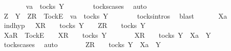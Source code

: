 \begin{isabellebody}
\ \ \ \ \isamarkupfalse%
\ \isamarkupfalse%
\ {\isachardoublequoteopen}va\ {\isasymin}\ tocks\ Y{\isachardoublequoteclose}\isanewline
\ \ \ \ \ \ \isamarkupfalse%
\ tocks{\isachardot}cases\ \isamarkupfalse%
\ auto\isanewline
\ \ \ \ \isamarkupfalse%
\ \isamarkupfalse%
\ {\isachardoublequoteopen}Z\ {\isasymsubseteq}\ Y\ {\isasymLongrightarrow}\ {\isacharbrackleft}Z{\isacharbrackright}\isactrlsub R\ {\isacharhash}\ {\isacharbrackleft}Tock{\isacharbrackright}\isactrlsub E\ {\isacharhash}\ va\ {\isasymin}\ tocks\ Y{\isachardoublequoteclose}\isanewline
\ \ \ \ \ \ \isamarkupfalse%
\ tocks{\isachardot}intros\ \isamarkupfalse%
\ blast\isanewline
\ \ \isamarkupfalse%
\isanewline
{}\isamarkupfalse%
\isanewline
\ \ \isamarkupfalse%
\ Xa\ {\isasymsigma}{\isacharprime}\isanewline
\ \ \isamarkupfalse%
\ ind{\isacharunderscore}hyp{\isacharcolon}\ {\isachardoublequoteopen}{\isasymsigma}{\isacharprime}\ {\isacharat}\ {\isacharbrackleft}X{\isacharbrackright}\isactrlsub R\ {\isacharhash}\ {\isasymsigma}\ {\isasymin}\ tocks\ Y\ {\isasymLongrightarrow}\ {\isasymsigma}{\isacharprime}\ {\isacharat}\ {\isacharbrackleft}Z{\isacharbrackright}\isactrlsub R\ {\isacharhash}\ {\isasymsigma}\ {\isasymin}\ tocks\ Y{\isachardoublequoteclose}\isanewline
\ \ \isamarkupfalse%
\ {\isachardoublequoteopen}{\isacharbrackleft}Xa{\isacharbrackright}\isactrlsub R\ {\isacharhash}\ {\isacharbrackleft}Tock{\isacharbrackright}\isactrlsub E\ {\isacharhash}\ {\isasymsigma}{\isacharprime}\ {\isacharat}\ {\isacharbrackleft}X{\isacharbrackright}\isactrlsub R\ {\isacharhash}\ {\isasymsigma}\ {\isasymin}\ tocks\ Y{\isachardoublequoteclose}\isanewline
\ \ \isamarkupfalse%
\ \isamarkupfalse%
\ {\isachardoublequoteopen}{\isasymsigma}{\isacharprime}\ {\isacharat}\ {\isacharbrackleft}X{\isacharbrackright}\isactrlsub R\ {\isacharhash}\ {\isasymsigma}\ {\isasymin}\ tocks\ Y\ {\isasymand}\ Xa\ {\isasymsubseteq}\ Y{\isachardoublequoteclose}\isanewline
\ \ \ \ \isamarkupfalse%
\ tocks{\isachardot}cases\ \isamarkupfalse%
\ auto\isanewline
\ \ \isamarkupfalse%
\ \isamarkupfalse%
\ {\isachardoublequoteopen}{\isasymsigma}{\isacharprime}\ {\isacharat}\ {\isacharbrackleft}Z{\isacharbrackright}\isactrlsub R\ {\isacharhash}\ {\isasymsigma}\ {\isasymin}\ tocks\ Y\ {\isasymand}\ Xa\ {\isasymsubseteq}\ Y{\isachardoublequoteclose}\isanewline

\end{isabellebody}
